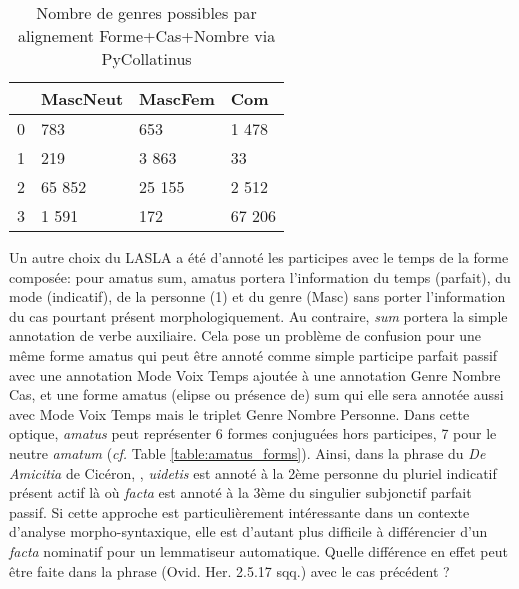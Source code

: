 \begin{table}[]
\centering
\begin{tabular}{l|lll}
\toprule
         & MascNeut & MascFem & Com    \\ \midrule
0        & 783      & 653     & 1 478  \\
1        & 219      & 3 863   & 33     \\
2        & 65 852   & 25 155  & 2 512  \\
3        & 1 591    & 172     & 67 206 \\ \bottomrule
\end{tabular}
\label{table:lasla:genders-alignement}
\caption{Nombre de genres possibles par alignement Forme+Cas+Nombre via PyCollatinus}
\end{table}

\newpara

Un autre choix du LASLA a été d'annoté les participes avec le temps de la forme composée: pour amatus sum, amatus portera l'information du temps (parfait), du mode (indicatif), de la personne (1) et du genre (Masc) sans porter l'information du cas pourtant présent morphologiquement. Au contraire, \textit{sum} portera la simple annotation de verbe auxiliaire. Cela pose un problème de confusion pour une même forme amatus qui peut être annoté comme simple participe parfait passif avec une annotation Mode Voix Temps ajoutée à une annotation Genre Nombre Cas, et une forme amatus (elipse ou présence de) sum qui elle sera annotée aussi avec Mode Voix Temps mais le triplet Genre Nombre Personne. Dans cette optique, \textit{amatus} peut représenter 6 formes conjuguées hors participes, 7 pour le neutre \textit{amatum} (\textit{cf.} Table \ref{table:amatus_forms}). %
%
%
Ainsi, dans la phrase du \textit{De Amicitia} de Cicéron, , \textit{uidetis} est annoté à la 2ème personne du pluriel indicatif présent actif là où \textit{facta} est annoté à la 3ème du singulier subjonctif parfait passif. Si cette approche est particulièrement intéressante dans un contexte d'analyse morpho-syntaxique, elle est d'autant plus difficile à différencier d'un \textit{facta} nominatif pour un lemmatiseur automatique. Quelle différence en effet peut être faite dans la phrase  (Ovid. Her. 2.5.17 sqq.) avec le cas précédent ? %

